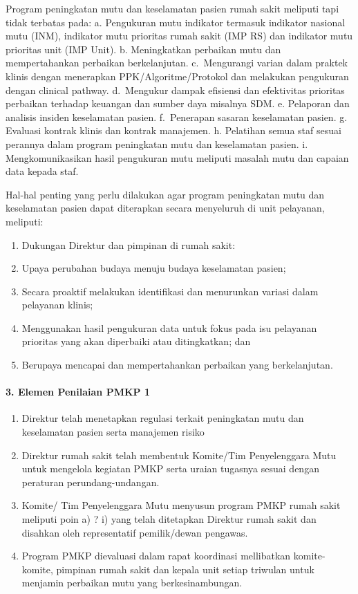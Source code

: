 \documentclass[
]{book}
\providecommand{\tightlist}{%
  \setlength{\itemsep}{0pt}\setlength{\parskip}{0pt}}
\begin{document}
Program peningkatan mutu dan keselamatan pasien rumah sakit meliputi tapi tidak terbatas pada:
a. Pengukuran mutu indikator termasuk indikator nasional mutu (INM), indikator mutu prioritas rumah sakit (IMP RS) dan indikator mutu prioritas unit (IMP Unit).
b. Meningkatkan perbaikan mutu dan mempertahankan perbaikan berkelanjutan.
c.~Mengurangi varian dalam praktek klinis dengan menerapkan PPK/Algoritme/Protokol dan melakukan pengukuran dengan clinical pathway.
d.~Mengukur dampak efisiensi dan efektivitas prioritas perbaikan terhadap keuangan dan sumber daya misalnya SDM.
e. Pelaporan dan analisis insiden keselamatan pasien.
f.~Penerapan sasaran keselamatan pasien.
g. Evaluasi kontrak klinis dan kontrak manajemen.
h. Pelatihan semua staf sesuai perannya dalam program peningkatan mutu dan keselamatan pasien.
i. Mengkomunikasikan hasil pengukuran mutu meliputi masalah mutu dan capaian data kepada staf.

Hal-hal penting yang perlu dilakukan agar program peningkatan mutu dan keselamatan pasien dapat diterapkan secara menyeluruh di unit pelayanan, meliputi:

\begin{enumerate}
\def\labelenumi{\alph{enumi}.}
\tightlist
\item
  Dukungan Direktur dan pimpinan di rumah sakit:
\item
  Upaya perubahan budaya menuju budaya keselamatan pasien;
\item
  Secara proaktif melakukan identifikasi dan menurunkan variasi dalam pelayanan klinis;
\item
  Menggunakan hasil pengukuran data untuk fokus pada isu pelayanan prioritas yang akan diperbaiki atau ditingkatkan; dan
\item
  Berupaya mencapai dan mempertahankan perbaikan yang berkelanjutan.
\end{enumerate}

\hypertarget{elemen-penilaian-pmkp-1}{%
\paragraph*{3. Elemen Penilaian PMKP 1}\label{elemen-penilaian-pmkp-1}}

\begin{enumerate}
\def\labelenumi{\alph{enumi}.}
\tightlist
\item
  Direktur telah menetapkan regulasi terkait peningkatan mutu dan keselamatan pasien serta manajemen risiko
\item
  Direktur rumah sakit telah membentuk Komite/Tim Penyelenggara Mutu untuk mengelola kegiatan PMKP serta uraian tugasnya sesuai dengan peraturan perundang-undangan.
\item
  Komite/ Tim Penyelenggara Mutu menyusun program PMKP rumah sakit meliputi poin a) ? i) yang telah ditetapkan Direktur rumah sakit dan disahkan oleh representatif pemilik/dewan pengawas.
\item
  Program PMKP dievaluasi dalam rapat koordinasi mellibatkan komite-komite, pimpinan rumah sakit dan kepala unit setiap triwulan untuk menjamin perbaikan mutu yang berkesinambungan.
\end{enumerate}
\end{document}

